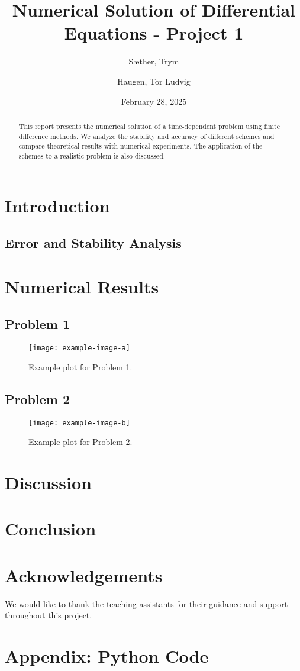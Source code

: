 \documentclass[a4paper,12pt]{report}
\title{Numerical Solution of Differential Equations - Project 1}
\author[1]{Sæther, Trym}
\author[1]{Haugen, Tor Ludvig}
\affil[1]{Department of Mathematical Sciences, NTNU}
\date{February 28, 2025}
\begin{document}
\maketitle

\begin{abstract}
This report presents the numerical solution of a time-dependent problem using finite difference methods. We analyze the stability and accuracy of different schemes and compare theoretical results with numerical experiments. The application of the schemes to a realistic problem is also discussed.
\end{abstract}

\section{Introduction}


\subsection{Error and Stability Analysis}
\lipsum[6]

\section{Numerical Results}
\subsection{Problem 1}
\lipsum[7]
\begin{figure}[H]
    \centering
    \texttt{[image: example-image-a]}
    \caption{Example plot for Problem 1.}
    \label{fig:problem1}
\end{figure}

\subsection{Problem 2}
\lipsum[8]
\begin{figure}[H]
    \centering
    \texttt{[image: example-image-b]}
    \caption{Example plot for Problem 2\cite{nocedalwright2006numerical}.}
    \label{fig:problem2}
\end{figure}

\section{Discussion}
\lipsum[9]

\section{Conclusion}
\lipsum[10]

\section*{Acknowledgements}
We would like to thank the teaching assistants for their guidance and support throughout this project.




\appendix
\section{Appendix: Python Code}
\inputminted{python}{code/code.py}
\end{document}
